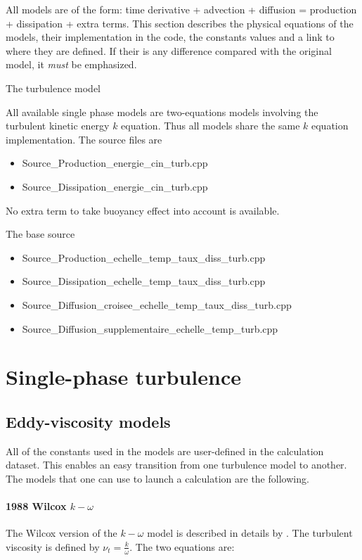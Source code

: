 All models are of the form: time derivative + advection + diffusion = production + dissipation + extra terms. This section describes the physical equations of the models, their implementation in the code, the constants values and a link to where they are defined. If their is any difference compared with the original model, it \emph{must} be emphasized.

The turbulence model

All available single phase models are two-equations models involving the turbulent kinetic energy $k$ equation. Thus all models share the same $k$ equation implementation. The source files are
\begin{itemize}
\item Source_Production_energie_cin_turb.cpp
\item Source_Dissipation_energie_cin_turb.cpp
\end{itemize}
No extra term to take buoyancy effect into account is available.

The base source
\begin{itemize}
\item Source_Production_echelle_temp_taux_diss_turb.cpp
\item Source_Dissipation_echelle_temp_taux_diss_turb.cpp
\item Source_Diffusion_croisee_echelle_temp_taux_diss_turb.cpp

\item Source_Diffusion_supplementaire_echelle_temp_turb.cpp
\end{itemize}

\section{Single-phase turbulence}

\subsection{Eddy-viscosity models}
All of the constants used in the models are user-defined in the calculation dataset. This enables an easy transition from one turbulence model to another. The models that one can use to launch a calculation are the following.

\paragraph{1988 Wilcox $k-\omega$}\mbox{}

The Wilcox version of the $k-\omega$ model is described in details by \cite{Wilcox1988}. The turbulent viscosity is defined by $\nu_t = \frac{k}{\omega}$. The two equations are:

